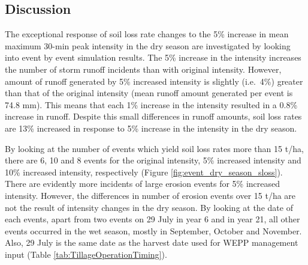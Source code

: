 %
%
%


\subsection{Discussion}
\label{sec:EstimationOfFutureSoilErosionDiscussion}

The exceptional response of soil loss rate changes to the 5\% increase in mean
maximum 30-min peak intensity in the dry season are investigated by looking into
event by event simulation results. The 5\% increase in the intensity increases
the number of storm runoff incidents than with original intensity. However,
amount of runoff generated by 5\% increased intensity is slightly (i.e.\ 4\%)
greater than that of the original intensity (mean runoff amount generated per
event is 74.8 mm). This means that each 1\% increase in the intensity resulted
in a 0.8\% increase in runoff. Despite this small differences in runoff amounts,
soil loss rates are 13\% increased in response to 5\% increase in the intensity
in the dry season.

By looking at the number of events which yield soil loss rates more than 15
t/ha, there are 6, 10 and 8 events for the original intensity, 5\% increased
intensity and 10\% increased intensity, respectively (Figure
\ref{fig:event_dry_season_sloss}). There are evidently more incidents of large
erosion events for 5\% increased intensity. However, the differences in number
of erosion events over 15 t/ha are not the result of intensity changes in the
dry season. By looking at the date of each events, apart from two events on 29
July in year 6 and in year 21, all other events occurred in the wet season,
mostly in September, October and November. Also, 29 July is the same date as the
harvest date used for WEPP management input (Table
\ref{tab:TillageOperationTiming}).

